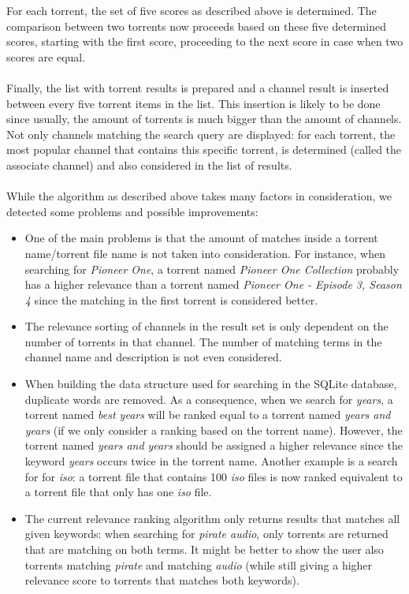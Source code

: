 For each torrent, the set of five scores as described above is determined. The comparison between two torrents now proceeds based on these five determined scores, starting with the first score, proceeding to the next score in case when two scores are equal.\\\\
Finally, the list with torrent results is prepared and a channel result is inserted between every five torrent items in the list. This insertion is likely to be done since usually, the amount of torrents is much bigger than the amount of channels. Not only channels matching the search query are displayed: for each torrent, the most popular channel that contains this specific torrent, is determined (called the associate channel) and also considered in the list of results.\\\\
While the algorithm as described above takes many factors in consideration, we detected some problems and possible improvements:
\begin{itemize}
	\item One of the main problems is that the amount of matches inside a torrent name/torrent file name is not taken into consideration. For instance, when searching for \emph{Pioneer One}, a torrent named \emph{Pioneer One Collection} probably has a higher relevance than a torrent named \emph{Pioneer One - Episode 3, Season 4} since the matching in the first torrent is considered better.
	\item The relevance sorting of channels in the result set is only dependent on the number of torrents in that channel. The number of matching terms in the channel name and description is not even considered.
	\item When building the data structure used for searching in the SQLite database, duplicate words are removed. As a consequence, when we search for \emph{years}, a torrent named \emph{best years} will be ranked equal to a torrent named \emph{years and years} (if we only consider a ranking based on the torrent name). However, the torrent named \emph{years and years} should be assigned a higher relevance since the keyword \emph{years} occurs twice in the torrent name. Another example is a search for for \emph{iso}: a torrent file that contains 100 \emph{iso} files is now ranked equivalent to a torrent file that only has one \emph{iso} file.
	\item The current relevance ranking algorithm only returns results that matches all given keywords: when searching for \emph{pirate audio}, only torrents are returned that are matching on both terms. It might be better to show the user also torrents matching \emph{pirate} and matching \emph{audio} (while still giving a higher relevance score to torrents that matches both keywords).
\end{itemize}


